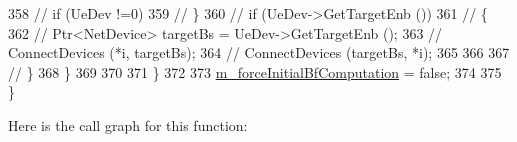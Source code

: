 \begin{DoxyCode}
358                         \textcolor{comment}{//      if (UeDev !=0)}
359                         \textcolor{comment}{// \}            }
360                         \textcolor{comment}{// if (UeDev->GetTargetEnb ()) }
361                         \textcolor{comment}{// \{}
362                         \textcolor{comment}{//      Ptr<NetDevice> targetBs = UeDev->GetTargetEnb ();}
363                         \textcolor{comment}{//      ConnectDevices (*i, targetBs);}
364                         \textcolor{comment}{//      ConnectDevices (targetBs, *i);}
365 
366                                 
367                         \textcolor{comment}{// \}    }
368                 \}
369 
370                 
371         \}
372 
373         \hyperlink{classns3_1_1MmWave3gppChannel_a2d5a32e24f0d795c5ed210f8c38f4e9b}{m\_forceInitialBfComputation} = \textcolor{keyword}{false};
374 
375 \}
\end{DoxyCode}


Here is the call graph for this function\+:


